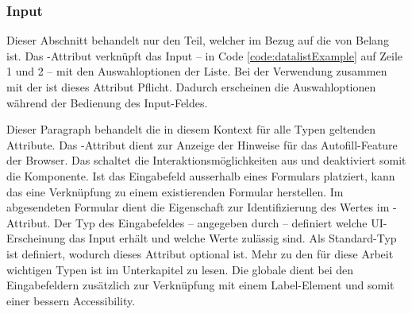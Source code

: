 \subsubsection{\color{dgray} Input}
\label{sec:input}

Dieser Abschnitt behandelt nur den Teil, welcher im Bezug auf die  von Belang ist. 
Das -Attribut verknüpft das Input – in Code \ref{code:datalistExample} auf Zeile 1 und 2 – mit den Auswahloptionen der Liste. 
Bei der Verwendung zusammen mit der  ist dieses Attribut Pflicht. 
Dadurch erscheinen die Auswahloptionen während der Bedienung des Input-Feldes. 

Dieser Paragraph behandelt die in diesem Kontext für alle Typen geltenden Attribute. 
Das -Attribut dient zur Anzeige der Hinweise für das Autofill-Feature der Browser. 
Das  schaltet die Interaktionsmöglichkeiten aus und deaktiviert somit die Komponente. 
Ist das Eingabefeld ausserhalb eines Formulars platziert, kann das  eine Verknüpfung zu einem existierenden Formular herstellen. 
Im abgesendeten Formular dient die Eigenschaft  zur Identifizierung des Wertes im -Attribut. 
Der Typ des Eingabefeldes – angegeben durch  – definiert welche UI-Erscheinung das Input erhält und welche Werte zulässig sind. 
Als Standard-Typ ist  definiert, wodurch dieses Attribut optional ist. 
Mehr zu den für diese Arbeit wichtigen Typen ist im Unterkapitel \textbf{} zu lesen. 
Die globale  dient bei den Eingabefeldern zusätzlich zur Verknüpfung mit einem Label-Element und somit einer bessern Accessibility. 


